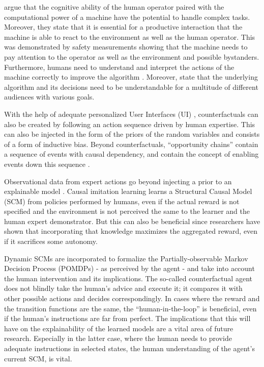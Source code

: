 \documentclass[twoside,11pt]{article}
\begin{document}
\citet{LiangEtAl:2017:HITLReinforcementLearn} argue that the cognitive ability of the human operator paired with the computational power of a machine have the potential to handle complex tasks. Moreover, they state that it is essential for a productive interaction that the machine is able to react to the environment as well as the human operator. This was demonstrated by safety measurements showing that the machine needs to pay attention to the operator as well as the environment and possible bystanders. Furthermore, humans need to understand and interpret the actions of the machine correctly to improve the algorithm \citep{heuillet2021explainability}. Moreover, \citet{heuillet2021explainability} state that the underlying algorithm and its decisions need to be understandable for a multitude of different audiences with various goals.


With the help of adequate personalized User Interfaces (UI) \citep{Sun:2021:TopologyPerturbationGNNs}, counterfactuals can also be created by following an action sequence driven by human expertise. This can also be injected in the form of the priors of the random variables and consists of a form of inductive bias.
Beyond counterfactuals, ``opportunity chains'' contain a sequence of events with causal dependency, and contain the concept of enabling events down this sequence \citep{Madumal:2020:DistalEF}.

Observational data from expert actions go beyond injecting a prior to an explainable model \citep{Zhang:2020:CausalImitationLearning}. Causal imitation learning learns a Structural Causal Model (SCM) \citep{Pearl:2000:ModelsReasoningInference} from policies performed by humans, even if the actual reward is not specified and the environment is not perceived the same to the learner and the human expert demonstrator. But this can also be beneficial since researchers have shown that incorporating that knowledge maximizes the aggregated reward, even if it sacrifices some autonomy. 

Dynamic SCMs are incorporated to formalize the Partially-observable Markov Decision Process (POMDPs) \citep{SuttonBarto:2018:RLIntroduction} - as perceived by the agent - and take into account the human intervention and its implications. The so-called counterfactual agent does not blindly take the human's advice and execute it; it compares it with other possible actions and decides correspondingly. In cases where the reward and the transition functions are the same, the ``human-in-the-loop'' is beneficial, even if the human's instructions are far from perfect. The implications that this will have on the explainability of the learned models are a vital area of future research. Especially in the latter case, where the human needs to provide adequate instructions in selected states, the human understanding of the agent's current SCM, is vital.  
\end{document}
